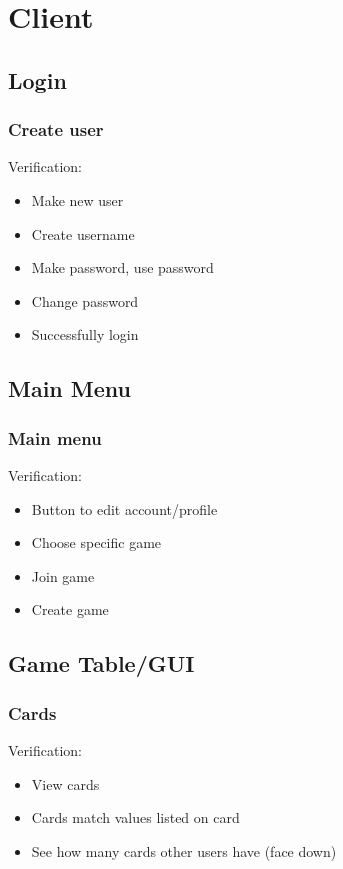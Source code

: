 \documentclass[11pt, titlepage]{article}
\begin{document}
			
	\section{Client}
	
		\subsection{Login}
			\subsubsection{Create user}
			Verification:
			\begin{itemize} 
				\item Make new user
				\item Create username
				\item Make password, use password
				\item Change password
				\item Successfully login 
			\end{itemize}

		\subsection{Main Menu}
			\subsubsection{Main menu}
			Verification:
				\begin{itemize}
					\item Button to edit account/profile
					\item Choose specific game
					\item Join game
					\item Create game
				\end{itemize}
			
		\subsection{Game Table/GUI}
			\subsubsection{Cards}
			Verification:
			\begin{itemize}
				\item View  cards
				\item Cards match values listed on card
				\item See how many cards other users have (face down) 
			\end{itemize}
\end{document}
